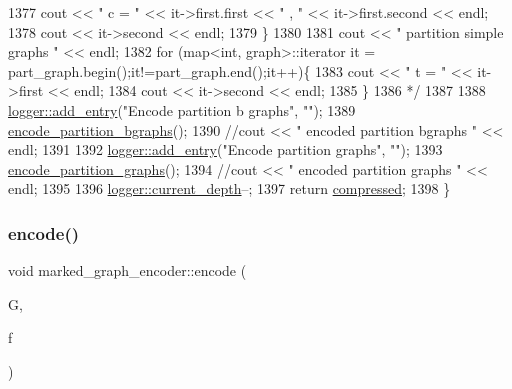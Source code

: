 \begin{DoxyCode}
1377 \textcolor{comment}{    cout << " c = " << it->first.first << " , " << it->first.second << endl;}
1378 \textcolor{comment}{    cout << it->second << endl;}
1379 \textcolor{comment}{  \}}
1380 \textcolor{comment}{}
1381 \textcolor{comment}{  cout << " partition simple graphs " << endl;}
1382 \textcolor{comment}{  for (map<int, graph>::iterator it = part\_graph.begin();it!=part\_graph.end();it++)\{}
1383 \textcolor{comment}{    cout << " t = " << it->first << endl;}
1384 \textcolor{comment}{    cout << it->second << endl;}
1385 \textcolor{comment}{  \}}
1386 \textcolor{comment}{  */}
1387 
1388   \hyperlink{classlogger_a710163deb17bc81f70d53d285b8ac9ac}{logger::add\_entry}(\textcolor{stringliteral}{"Encode partition b graphs"}, \textcolor{stringliteral}{""});
1389   \hyperlink{classmarked__graph__encoder_aa113c4870e3221faa332b2151b63d9e6}{encode\_partition\_bgraphs}();
1390   \textcolor{comment}{//cout << " encoded partition bgraphs " << endl;}
1391 
1392   \hyperlink{classlogger_a710163deb17bc81f70d53d285b8ac9ac}{logger::add\_entry}(\textcolor{stringliteral}{"Encode partition graphs"}, \textcolor{stringliteral}{""});
1393   \hyperlink{classmarked__graph__encoder_a654463d4b256b84225f5944b5e361ebf}{encode\_partition\_graphs}();
1394   \textcolor{comment}{//cout << " encoded partition graphs " << endl;}
1395   
1396   \hyperlink{classlogger_a9d29b49bd318a719a8e85b59eac54fe0}{logger::current\_depth}--;
1397   \textcolor{keywordflow}{return} \hyperlink{classmarked__graph__encoder_ac2ded200860fdd2321f86dd76b28bcb3}{compressed};
1398 \}
\end{DoxyCode}
\mbox{\label{classmarked__graph__encoder_a75b32c3c4557bec3322df60ac476fdc9}} 
\subsubsection{\texorpdfstring{encode()}{encode()}\hspace{0.1cm}{\footnotesize\ttfamily [2/2]}}
{\footnotesize\ttfamily void marked\+\_\+graph\+\_\+encoder\+::encode (\begin{DoxyParamCaption}\item[{const \hyperlink{classmarked__graph}{marked\+\_\+graph} \&}]{G,  }\item[{F\+I\+LE $\ast$}]{f }\end{DoxyParamCaption})}



